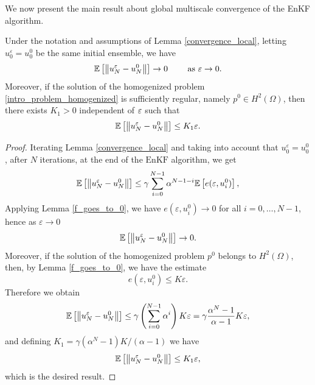 \documentclass[10pt]{article}
\begin{document}
We now present the main result about global multiscale convergence of the EnKF algorithm.

\begin{proposition} \label{convergence_result}
Under the notation and assumptions of Lemma \ref{convergence_local}, letting $u_0^{\varepsilon} = u_0^0$ be the same initial ensemble, we have
\[ \mathbb{E} \left [ \left\|u_N^{\varepsilon} - u_N^0\right\| \right ] \to 0 \qquad \text{ as } \varepsilon \to 0.  \]
Moreover, if the solution of the homogenized problem \eqref{intro_problem_homogenized} is sufficiently regular, namely $p^0 \in H^2(\Omega)$, then there exists $K_1 > 0$ independent of $\varepsilon$ such that
\[ \mathbb{E} \left [ \left\|u_N^{\varepsilon} - u_N^0\right\| \right ] \le K_1 \varepsilon. \]
\end{proposition}
\begin{proof}
	Iterating Lemma \ref{convergence_local} and taking into account that $u_0^{\varepsilon} = u_0^0$, after $N$ iterations, at the end of the $\mathrm{EnKF}$ algorithm, we get
	\begin{equation*}
		\mathbb{E} \left [ \left\|u_N^{\varepsilon} - u_N^0\right\| \right ] \le \gamma \sum_{i=0}^{N-1} \alpha^{N-1-i} \mathbb{E} \left [ e(\varepsilon, u^0_i) \right ],
	\end{equation*}
	Applying Lemma \ref{f_goes_to_0}, we have $e(\varepsilon, u_i^0) \to 0$ for all $i = 0, \dots, N-1$, hence as $\varepsilon \to 0$
	\begin{equation*}
		\mathbb{E} \left [ \left\|u_N^{\varepsilon} - u_N^0\right\| \right ] \to 0.
	\end{equation*}
	Moreover, if the solution of the homogenized problem $p^0$ belongs to $H^2(\Omega)$, then, by Lemma \ref{f_goes_to_0}, we have the estimate
	\[ e(\varepsilon, u_i^0) \le K \varepsilon. \]
	Therefore we obtain
	\begin{equation*}
	\mathbb{E} \left [ \left\|u_N^{\varepsilon} - u_N^0\right\| \right ] \le \gamma \left ( \sum_{i=0}^{N-1} \alpha^{i} \right ) K \varepsilon = \gamma \frac{\alpha^N - 1}{\alpha - 1} K \varepsilon,
	\end{equation*}
	and defining $K_1 = \gamma (\alpha^N - 1) K /(\alpha - 1)$ we have
	\[ \mathbb{E} \left [ \left\|u_N^{\varepsilon} - u_N^0\right\| \right ] \le K_1 \varepsilon, \]
	which is the desired result.
\end{proof}
\end{document}
